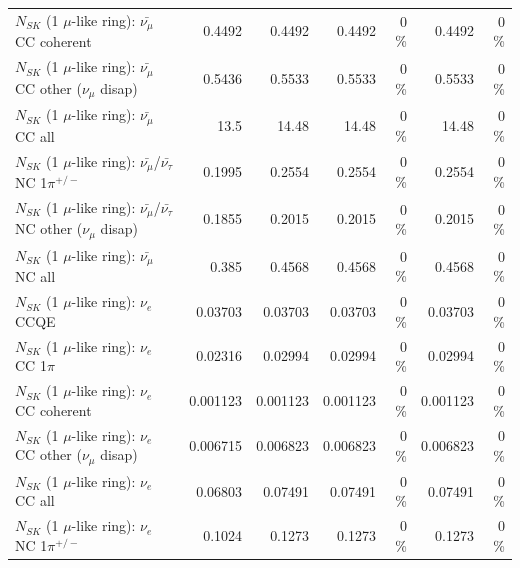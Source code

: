 \begin{table}
\begin{tabular}{| l | r | r | r  r | r  r |}
                       $N_{SK}$ (1 $\mu$-like ring): $\bar{\nu_\mu}$ CC coherent &          0.4492 &          0.4492 &          0.4492 &        0 \%  &          0.4492 &        0 \%  \\ 
        $N_{SK}$ (1 $\mu$-like ring): $\bar{\nu_\mu}$ CC other ($\nu_\mu$ disap) &          0.5436 &          0.5533 &          0.5533 &        0 \%  &          0.5533 &        0 \%  \\ 
                          $N_{SK}$ (1 $\mu$-like ring): $\bar{\nu_{\mu}}$ CC all &            13.5 &           14.48 &           14.48 &        0 \%  &           14.48 &        0 \%  \\ 
\hline
  $N_{SK}$ (1 $\mu$-like ring): $\bar{\nu_\mu}$/$\bar{\nu_\tau}$ NC 1$\pi^{+/-}$ &          0.1995 &          0.2554 &          0.2554 &        0 \%  &          0.2554 &        0 \%  \\ 
$N_{SK}$ (1 $\mu$-like ring): $\bar{\nu_\mu}$/$\bar{\nu_\tau}$ NC other ($\nu_\mu$ disap) &          0.1855 &          0.2015 &          0.2015 &        0 \%  &          0.2015 &        0 \%  \\ 
                          $N_{SK}$ (1 $\mu$-like ring): $\bar{\nu_{\mu}}$ NC all &           0.385 &          0.4568 &          0.4568 &        0 \%  &          0.4568 &        0 \%  \\ 
\hline
\hline
\hline
                                      $N_{SK}$ (1 $\mu$-like ring): $\nu_e$ CCQE &         0.03703 &         0.03703 &         0.03703 &        0 \%  &         0.03703 &        0 \%  \\ 
                                 $N_{SK}$ (1 $\mu$-like ring): $\nu_e$ CC 1$\pi$ &         0.02316 &         0.02994 &         0.02994 &        0 \%  &         0.02994 &        0 \%  \\ 
                               $N_{SK}$ (1 $\mu$-like ring): $\nu_e$ CC coherent &        0.001123 &        0.001123 &        0.001123 &        0 \%  &        0.001123 &        0 \%  \\ 
                $N_{SK}$ (1 $\mu$-like ring): $\nu_e$ CC other ($\nu_\mu$ disap) &        0.006715 &        0.006823 &        0.006823 &        0 \%  &        0.006823 &        0 \%  \\ 
                                  $N_{SK}$ (1 $\mu$-like ring): $\nu_{e}$ CC all &         0.06803 &         0.07491 &         0.07491 &        0 \%  &         0.07491 &        0 \%  \\ 
\hline
                           $N_{SK}$ (1 $\mu$-like ring): $\nu_e$ NC 1$\pi^{+/-}$ &          0.1024 &          0.1273 &          0.1273 &        0 \%  &          0.1273 &        0 \%  \\ 

\end{tabular}
\end{table}
